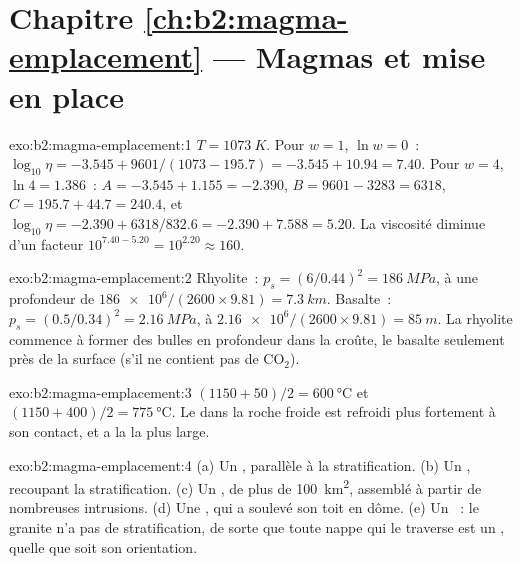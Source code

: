 \section*{Chapitre \ref{ch:b2:magma-emplacement} --- Magmas et mise en place}

\begin{solution}{exo:b2:magma-emplacement:1}
$T = \qty{1073}{K}$. Pour $w = 1$, $\ln w = 0$~: $\log_{10}\eta = -3.545 +
9601/(1073 - 195.7) = -3.545 + 10.94 = 7.40$. Pour $w = 4$, $\ln 4 = 1.386$~:
$A = -3.545 + 1.155 = -2.390$, $B = 9601 - 3283 = 6318$, $C = 195.7 + 44.7 =
240.4$, et $\log_{10}\eta = -2.390 + 6318/832.6 = -2.390 + 7.588 = 5.20$. La
viscosité diminue d'un facteur $10^{7.40 - 5.20} = 10^{2.20} \approx 160$.
\end{solution}

\begin{solution}{exo:b2:magma-emplacement:2}
Rhyolite~: $p_s = (6/0.44)^2 = \qty{186}{MPa}$, à une profondeur de $\num{186e6}/(2600\times9.81)
= \qty{7.3}{km}$. Basalte~: $p_s = (0.5/0.34)^2 = \qty{2.16}{MPa}$, à
$\num{2.16e6}/(2600\times9.81) = \qty{85}{m}$. La rhyolite commence à former des bulles
en profondeur dans la croûte, le basalte seulement près de la surface (s'il ne contient pas de CO$_2$).
\end{solution}

\begin{solution}{exo:b2:magma-emplacement:3}
$(1150 + 50)/2 = \qty{600}{\celsius}$ et $(1150 + 400)/2 = \qty{775}{\celsius}$. Le
 dans la roche froide est refroidi plus fortement à son contact, et a la 
la plus large.
\end{solution}

\begin{solution}{exo:b2:magma-emplacement:4}
(a) Un , parallèle à la stratification. (b) Un , recoupant la stratification.
(c) Un , de plus de \qty{100}{km^2}, assemblé à partir de nombreuses intrusions.
(d) Une , qui a soulevé son toit en dôme. (e) Un ~: le granite n'a pas de stratification,
de sorte que toute nappe qui le traverse est un , quelle que soit son orientation.
\end{solution}

